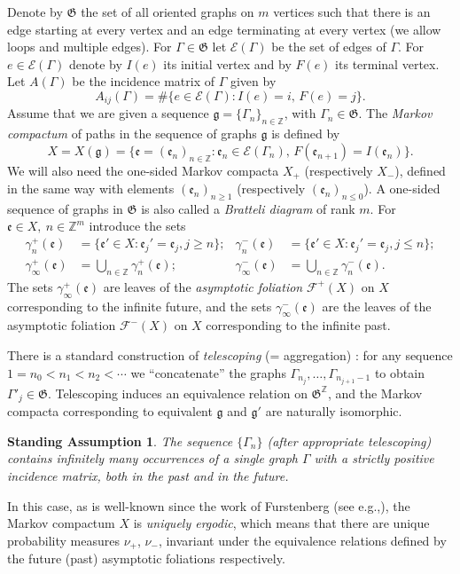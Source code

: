 \documentclass[11pt]{article}
\newcommand{\eg}{e.g.,\xspace}
\numberwithin{equation}{section}\newcommand{\Relation}[2][]{}\newtheorem*{prop*}{Proposition}
\let\mathcal\mathscr
\newcommand{\sep}{:}
\theoremstyle{plain}
\newtheorem*{standass}{Standing Assumption}
\theoremstyle{definition}
\let\gam\gamma
\let\Gam\Gamma
\newcommand\ef{\mathfrak{e}}
\newcommand\gf{\mathfrak{g}}
\newcommand\Frg{\mathfrak{G}}
\newcommand{\Ek}{\mathcal{E}}
\newcommand{\Fk}{\mathcal{F}}
\newcommand{\Z}{\mathbb{Z}}
\begin{document}
Denote by $\Frg$ the set of all oriented graphs on $m$ vertices such that there is an edge starting at every vertex and an edge terminating at every vertex (we allow loops and multiple edges).
For $\Gam\in \Frg$ let $\Ek(\Gam)$ be the set of edges of $\Gam$. For $e\in \Ek(\Gam)$ denote by $I(e)$ its initial vertex and by $F(e)$ its terminal vertex. Let $A(\Gam)$ be the incidence matrix of $\Gam$ given by
\[
A_{ij}(\Gam) = \#\{e\in \Ek(\Gam)\sep I(e) = i,\,F(e) = j\}.
\]
Assume that we are given a sequence $\gf = \{\Gam_n\}_{n\in \Z}$, with $\Gam_n \in \Frg$. The \emph{Markov compactum} of paths in the sequence of graphs $\gf$ is defined by
\[
X = X(\gf) = \{\ef = (\ef_n)_{n\in \Z}\sep \ef_n \in \Ek(\Gam_n),\, F(\ef_{n+1}) = I(\ef_n)\}.
\]
We will also need the one-sided Markov compacta $X_+$ (respectively $X_-$), defined in the same way with elements $(\ef_n)_{n\ge 1}$ (respectively $(\ef_n)_{n\le 0}$). A one-sided sequence of graphs in $\Frg$ is also called a \emph{Bratteli diagram} of rank $m$.
For $\ef\in X,\ n\in \Z^m$ introduce the sets
\begin{align*}
\gam_n^+(\ef) &= \{\ef'\in X\sep \ef_j'=\ef_j, j\ge n\};& \gam_n^-(\ef) &= \{\ef'\in X\sep \ef_j'=\ef_j, j\le n\};\\
\gam_\infty^+(\ef) &= \bigcup_{n\in \Z} \gam_n^+(\ef);& \gam_\infty^-(\ef) &= \bigcup_{n\in \Z} \gam_n^-(\ef).
\end{align*}
The sets $\gam_\infty^+(\ef)$ are leaves of the \emph{asymptotic foliation} $\Fk^+(X)$ on $X$ corresponding to the infinite future, and the sets $\gam_\infty^-(\ef)$
are the leaves of the asymptotic foliation $\Fk^-(X)$ on $X$ corresponding to the infinite past.

There is a standard construction of \emph{telescoping} (= aggregation) \cite[2.4]{Buf-umn}: for any sequence $1=n_0<n_1 < n_2< \cdots$ we ``concatenate'' the graphs
$\Gam_{n_j},\ldots, \Gam_{n_{j+1}-1}$ to obtain $\Gam'_j\in \Frg$. Telescoping induces an equivalence relation on $\Frg^\Z$, and the Markov compacta corresponding to equivalent $\gf$ and $\gf'$ are naturally isomorphic.

\begin{standass}
The sequence $\{\Gam_n\}$ (after appropriate
telescoping) contains infinitely many occurrences of a single graph $\Gam$ with a strictly positive incidence matrix, both in the past and in the future.
\end{standass}

In this case, as is
well-known since the work of Furstenberg (see \eg \cite[(16.13)]{furst}), the
Markov compactum $X$ is \emph{uniquely ergodic}, which means that there are unique probability measures $\nu_+$, $\nu_-$, invariant under the equivalence relations defined by the future (past) asymptotic foliations respectively.
\end{document}

